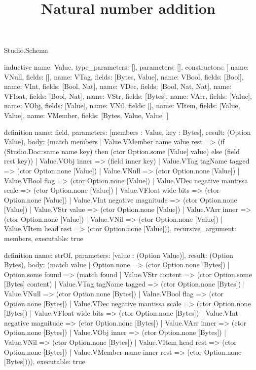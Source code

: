 \begin{lexlean}{Studio.Schema}
\title{Natural number addition}
\begin{semanticmodule}
inductive{
  name: Value,
  type_parameters: [],
  parameters: [],
  constructors: [
    {name: VNull, fields: []},
    {name: VTag, fields: [Bytes, Value]},
    {name: VBool, fields: [Bool]},
    {name: VInt, fields: [Bool, Nat]},
    {name: VDec, fields: [Bool, Nat, Nat]},
    {name: VFloat, fields: [Bool, Nat]},
    {name: VStr, fields: [Bytes]},
    {name: VArr, fields: [Value]},
    {name: VObj, fields: [Value]},
    {name: VNil, fields: []},
    {name: VItem, fields: [Value, Value]},
    {name: VMember, fields: [Bytes, Value, Value]}
  ]
}

definition{
  name: field,
  parameters: [members : Value, key : Bytes],
  result: (Option Value),
  body: (match members
    | Value.VMember name value rest => (if (Studio.Doc::same name key) then (ctor Option.some [Value] value) else (field rest key))
    | Value.VObj inner => (field inner key)
    | Value.VTag tagName tagged => (ctor Option.none [Value])
    | Value.VNull => (ctor Option.none [Value])
    | Value.VBool flag => (ctor Option.none [Value])
    | Value.VDec negative mantissa scale => (ctor Option.none [Value])
    | Value.VFloat wide bits => (ctor Option.none [Value])
    | Value.VInt negative magnitude => (ctor Option.none [Value])
    | Value.VStr value => (ctor Option.none [Value])
    | Value.VArr inner => (ctor Option.none [Value])
    | Value.VNil => (ctor Option.none [Value])
    | Value.VItem head rest => (ctor Option.none [Value])),
  recursive_argument: members,
  executable: true
}

definition{
  name: strOf,
  parameters: [value : (Option Value)],
  result: (Option Bytes),
  body: (match value
    | Option.none => (ctor Option.none [Bytes])
    | Option.some found => (match found
      | Value.VStr content => (ctor Option.some [Bytes] content)
      | Value.VTag tagName tagged => (ctor Option.none [Bytes])
      | Value.VNull => (ctor Option.none [Bytes])
      | Value.VBool flag => (ctor Option.none [Bytes])
      | Value.VDec negative mantissa scale => (ctor Option.none [Bytes])
      | Value.VFloat wide bits => (ctor Option.none [Bytes])
      | Value.VInt negative magnitude => (ctor Option.none [Bytes])
      | Value.VArr inner => (ctor Option.none [Bytes])
      | Value.VObj inner => (ctor Option.none [Bytes])
      | Value.VNil => (ctor Option.none [Bytes])
      | Value.VItem head rest => (ctor Option.none [Bytes])
      | Value.VMember name inner rest => (ctor Option.none [Bytes]))),
  executable: true
}


\end{semanticmodule}
\end{lexlean}
